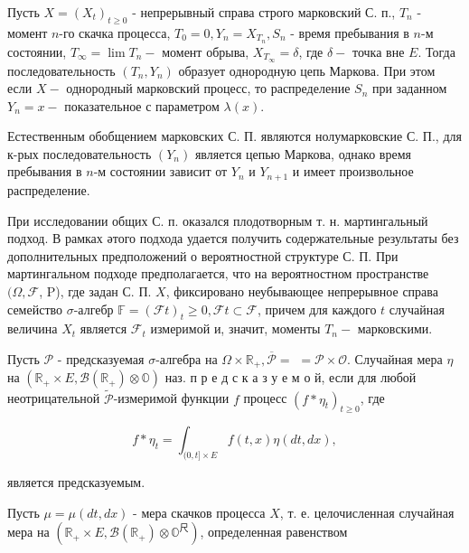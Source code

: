 \documentclass[10pt]{article}
\begin{document}
Пусть $X=\left(X_{t}\right)_{t \geqslant 0}$ - непрерывный справа строго марковский С. п., $T_{n}$ - момент $n$-го скачка процесса, $T_{0}=0, Y_{n}=X_{T_{n}}, S_{n}$ - время пребывания в $n$-м состоянии, $T_{\infty}=\lim T_{n}-$ момент обрыва, $X_{T_{\infty}}=\delta$, где $\delta-$ точка вне $E$. Тогда последовательность $\left(T_{n}, Y_{n}\right)$ образует однородную цепь Маркова. При этом если $X-$ однородный марковский процесс, то распределение $S_{n}$ при заданном $Y_{n}=x-$ показательное с параметром $\lambda(x)$.



Естественным обобщением марковских С. П. являются нолумарковские С. П., для к-рых последовательность $\left(Y_{n}\right)$ является цепью Маркова, однако время пребывания в $n$-м состоянии зависит от $Y_{n}$ и $Y_{n+1}$ и имеет произвольное распределение.



При исследовании общих С. п. оказался плодотворным т. н. мартингальный подход. В рамках әтого подхода удается получить содержательные результаты без дополнительных предположений о вероятностной структуре С. П. При мартингальном подходе предполагается, что на вероятностном пространстве $(\Omega, \mathscr{F}$, P), где задан С. П. $X$, фиксировано неубывающее непрерывное справа семейство $\sigma$-алгебр $\mathbb{F}=(\mathscr{F} t)_{t} \geqslant 0, \mathscr{F} t \subset \mathscr{F}$, причем для каждого $t$ случайная величина $X_{t}$ является $\mathscr{F}_{t}$ измеримой и, значит, моменты $T_{n}-$ марковскими.



Пусть $\mathscr{P}$ - предсказуемая $\sigma$-алгебра на $\Omega \times \mathbb{R}_{+}, \overline{\mathscr{P}}=$ $=\mathscr{P} \times \mathscr{O}$. Случайная мера $\eta$ на $\left(\mathbb{R}_{+} \times E, \mathscr{B}\left(\mathbb{R}_{+}\right) \otimes \mathbb{O}\right)$ наз. п р е д с к а з у е м о й, если для любой неотрицательной $\widetilde{\mathcal{P}}$-измеримой функции $f$ процесс $\left(f * \eta_{t}\right)_{t \geqslant 0}$, где



\[

f * \eta_{t}=\int_{(0, t] \times E} f(t, x) \eta(d t, d x),

\]



является предсказуемым.



Пусть $\mu=\mu(d t, d x)$ - мера скачков процесса $X$, т. е. целочисленная случайная мера на $\left(\mathbb{R}_{+} \times E, \mathscr{B}\left(\mathbb{R}_{+}\right) \otimes \mathbb{O}^{尺}\right)$, определенная равенством
\end{document}
